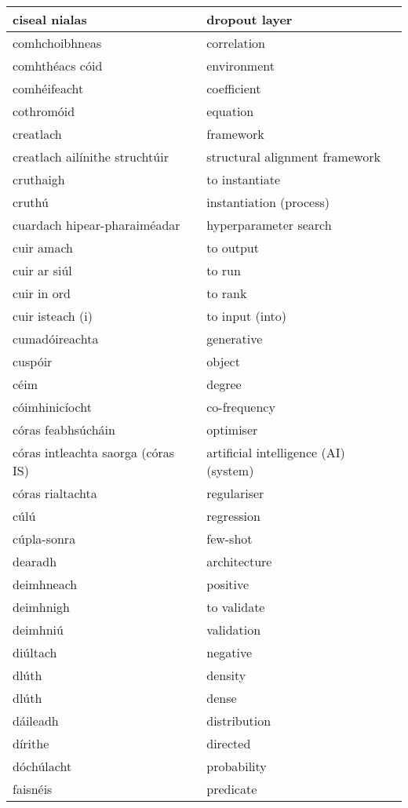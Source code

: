 \documentclass{article}
\begin{document}
\begin{longtable}{|l|l|}
		ciseal nialas&dropout layer\\ \hline 
		comhchoibhneas&correlation\\ \hline 
		comhthéacs cóid&environment\\ \hline 
		comhéifeacht&coefficient\\ \hline 
		cothromóid&equation\\ \hline 
		creatlach&framework\\ \hline 
		creatlach ailínithe struchtúir&structural alignment framework\\ \hline 
		cruthaigh&to instantiate\\ \hline 
		cruthú&instantiation (process)\\ \hline 
		cuardach hipear-pharaiméadar&hyperparameter search\\ \hline 
		cuir amach&to output\\ \hline 
		cuir ar siúl&to run\\ \hline 
		cuir in ord&to rank\\ \hline 
		cuir isteach (i)&to input (into)\\ \hline 
		cumadóireachta&generative\\ \hline 
		cuspóir&object\\ \hline 
		céim&degree\\ \hline 
		cóimhinicíocht&co-frequency\\ \hline 
		córas feabhsúcháin&optimiser\\ \hline 
		córas intleachta saorga (córas IS)&artificial intelligence (AI) (system)\\ \hline 
		córas rialtachta&regulariser\\ \hline 
		cúlú&regression\\ \hline 
		cúpla-sonra&few-shot\\ \hline 
		dearadh&architecture\\ \hline 
		deimhneach&positive\\ \hline 
		deimhnigh&to validate\\ \hline 
		deimhniú&validation\\ \hline 
		diúltach&negative\\ \hline 
		dlúth&density\\ \hline 
		dlúth&dense\\ \hline 
		dáileadh&distribution\\ \hline 
		dírithe&directed\\ \hline 
		dóchúlacht&probability\\ \hline 
		faisnéis&predicate\\ \hline 

\end{longtable}
\end{document}
